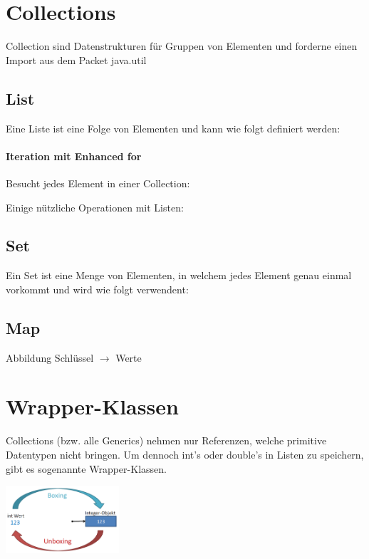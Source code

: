 \section*{Collections}
	Collection sind Datenstrukturen für Gruppen von Elementen und forderne einen Import aus dem Packet java.util
	\subsection*{List}
	\begin{minipage}[t]{11cm}
			Eine Liste ist eine Folge von Elementen und kann wie folgt definiert werden:
			
	\end{minipage}
	\hspace*{0.5cm}
	\begin{minipage}[t]{7.3cm}
		\vspace*{-0.18cm}
		\paragraph*{Iteration mit Enhanced for}
			Besucht jedes Element in einer Collection:
			
	\end{minipage}
	Einige nützliche Operationen mit Listen:
	
	\subsection*{Set}
		Ein Set ist eine Menge von Elementen, in welchem jedes Element genau einmal vorkommt und wird wie folgt verwendent:
		
	\subsection*{Map}
		Abbildung Schlüssel $\rightarrow$ Werte
		
\section*{Wrapper-Klassen}
	Collections (bzw. alle Generics) nehmen nur Referenzen, welche primitive Datentypen nicht bringen. Um dennoch int's oder double's in Listen zu speichern, gibt es sogenannte Wrapper-Klassen.\\
	\begin{minipage}[t]{10cm}
		
	\end{minipage}
	\hspace*{0.5cm}
	\begin{minipage}[b]{7.3cm}
		\includegraphics[height=2.5cm, align=t]{pics/boxing_unboxing.PNG}
	\end{minipage}